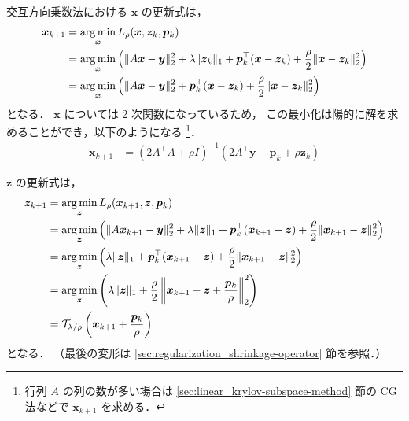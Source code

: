 交互方向乗数法における $\bm{x}$ の更新式は，
\begin{align}
    \bm{x}_{k+1}
     & = \operatorname*{arg \thinspace min}_{\bm{x}} L_{\rho}(\bm{x}, \bm{z}_k, \bm{p}_k)
    \notag                                                                          \\
     & = \operatorname*{arg \thinspace min}_{\bm{x}} \left( \|A \bm{x} - \bm{y}\|_2^2 + \lambda \|\bm{z}_k\|_1
    + \bm{p}_k^\top (\bm{x} - \bm{z}_k)
    + \frac{\rho}{2} \|\bm{x} - \bm{z}_k\|_2^2 \right)
    \notag                                                                          \\
     & = \operatorname*{arg \thinspace min}_{\bm{x}} \left( \|A \bm{x} - \bm{y}\|_2^2
    + \bm{p}_k^\top (\bm{x} - \bm{z}_k)
    + \frac{\rho}{2} \|\bm{x} - \bm{z}_k\|_2^2 \right)
\end{align}
となる．
$\bm{x}$ については 2 次関数になっているため，
この最小化は陽的に解を求めることができ，以下のようになる
\footnote{行列 $A$ の列の数が多い場合は%
    \ref{sec:linear_krylov-subspace-method} 節の%
    CG 法などで $\bm{x}_{k+1}$ を求める．}．
\begin{align}
    \bm{x}_{k+1}
     & = (2 A^\top A + \rho I)^{-1} (2 A^\top \bm{y} - \bm{p}_k + \rho \bm{z}_k)
\end{align}

$\bm{z}$ の更新式は，
\begin{align}
    \bm{z}_{k+1}
     & = \operatorname*{arg \thinspace min}_{\bm{z}} L_{\rho}(\bm{x}_{k+1}, \bm{z}, \bm{p}_k)
    \notag                                                                              \\
     & = \operatorname*{arg \thinspace min}_{\bm{z}} \left( \|A \bm{x}_{k+1} - \bm{y}\|_2^2 + \lambda \|\bm{z}\|_1
    + \bm{p}_k^\top (\bm{x}_{k+1} - \bm{z})
    + \frac{\rho}{2} \|\bm{x}_{k+1} - \bm{z}\|_2^2 \right)
    \notag                                                                              \\
     & = \operatorname*{arg \thinspace min}_{\bm{z}} \left( \lambda \|\bm{z}\|_1
    + \bm{p}_k^\top (\bm{x}_{k+1} - \bm{z})
    + \frac{\rho}{2} \|\bm{x}_{k+1} - \bm{z}\|_2^2 \right)
    \notag                                                                              \\
     & = \operatorname*{arg \thinspace min}_{\bm{z}} \left( \lambda \|\bm{z}\|_1
    + \frac{\rho}{2} \left\|\bm{x}_{k+1} - \bm{z} + \frac{\bm{p}_k}{\rho} \right\|_2^2 \right)
    \notag                                                                              \\
     & = \mathcal{T}_{\lambda/\rho} \left( \bm{x}_{k+1} + \frac{\bm{p}_k}{\rho} \right)
\end{align}
となる．
（最後の変形は \ref{sec:regularization_shrinkage-operator} 節を参照．）


